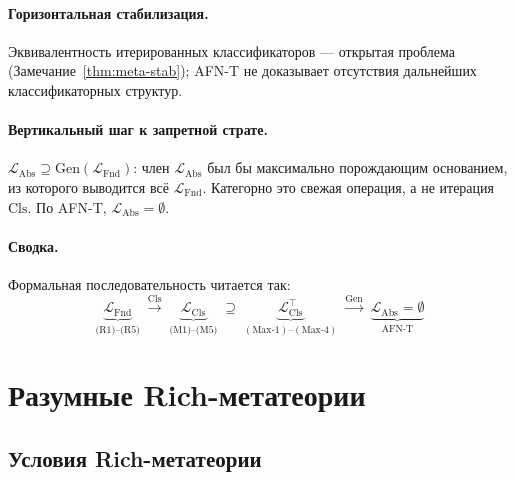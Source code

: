 \documentclass[11pt]{article}
\theoremstyle{plain}
\theoremstyle{definition}
\newcommand{\LFnd}{\mathcal{L}_{\mathrm{Fnd}}}
\newcommand{\LCls}{\mathcal{L}_{\mathrm{Cls}}}
\newcommand{\LClsMax}{\mathcal{L}_{\mathrm{Cls}}^{\top}}
\newcommand{\LAbs}{\mathcal{L}_{\mathrm{Abs}}}
\begin{document}
\paragraph{Горизонтальная стабилизация.} Эквивалентность итерированных классификаторов — открытая проблема (Замечание~\ref{thm:meta-stab}); AFN-T не доказывает отсутствия дальнейших классификаторных структур.

\paragraph{Вертикальный шаг к запретной страте.} $\LAbs \supseteq \mathrm{Gen}(\LFnd)$: член $\LAbs$ был бы максимально порождающим основанием, из которого выводится всё $\LFnd$. Категорно это свежая операция, а не итерация $\mathrm{Cls}$. По AFN-T, $\LAbs = \emptyset$.

\paragraph{Сводка.} Формальная последовательность читается так:
\[
\underbrace{\LFnd}_{\text{(R1)--(R5)}} \; \xrightarrow{\mathrm{Cls}} \; \underbrace{\LCls}_{\text{(M1)--(M5)}} \; \supseteq \; \underbrace{\LClsMax}_{(\mathrm{Max}\text{-1})\text{--}(\mathrm{Max}\text{-4})} \; \xrightarrow{\mathrm{Gen}} \; \underbrace{\LAbs = \emptyset}_{\text{AFN-T}}
\]

\section{Разумные Rich-метатеории}\label{sec:rs}

\subsection{Условия Rich-метатеории}
\end{document}
